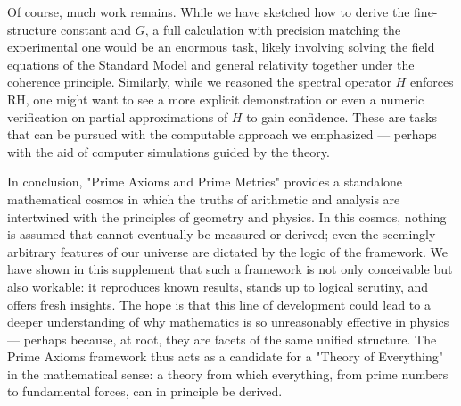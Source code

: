 \documentclass[11pt]{article}
\begin{document}
Of course, much work remains. While we have sketched how to derive the fine-structure constant and $G$, a full calculation with precision matching the experimental one would be an enormous task, likely involving solving the field equations of the Standard Model and general relativity together under the coherence principle. Similarly, while we reasoned the spectral operator $H$ enforces RH, one might want to see a more explicit demonstration or even a numeric verification on partial approximations of $H$ to gain confidence. These are tasks that can be pursued with the computable approach we emphasized — perhaps with the aid of computer simulations guided by the theory.

In conclusion, "Prime Axioms and Prime Metrics" provides a standalone mathematical cosmos in which the truths of arithmetic and analysis are intertwined with the principles of geometry and physics. In this cosmos, nothing is assumed that cannot eventually be measured or derived; even the seemingly arbitrary features of our universe are dictated by the logic of the framework. We have shown in this supplement that such a framework is not only conceivable but also workable: it reproduces known results, stands up to logical scrutiny, and offers fresh insights. The hope is that this line of development could lead to a deeper understanding of why mathematics is so unreasonably effective in physics — perhaps because, at root, they are facets of the same unified structure. The Prime Axioms framework thus acts as a candidate for a "Theory of Everything" in the mathematical sense: a theory from which everything, from prime numbers to fundamental forces, can in principle be derived. 
\end{document}
